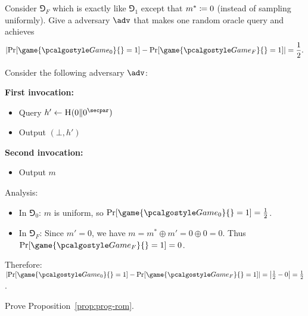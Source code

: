 \begin{exercise}
  Consider $\Game_F$ which is exactly like $\Game_1$ except that $m^* \coloneq 0$ (instead of sampling uniformly). Give a \ppt adversary $\adv$ that makes one random oracle query and achieves
  \[
    \left|\Pr[\game{\Game_0}{} = 1] - \Pr[\game{\Game_F}{} = 1]\right| = \frac{1}{2}.
  \]
\end{exercise}

\ifsolutions
\begin{mysolution}
  Consider the following adversary $\adv$:
  
  \textbf{First invocation:}
  \begin{itemize}
    \item Query $h' \gets \pcoracle{H}(0 \| 0^\secpar)$
    \item Output $(\bot, h')$
  \end{itemize}
  
  \textbf{Second invocation:}
  \begin{itemize}
    \item Output $m$
  \end{itemize}
  
  Analysis:
  \begin{itemize}
    \item In $\Game_0$: $m$ is uniform, so $\Pr[\game{\Game_0}{} = 1] = \frac{1}{2}$.
    \item In $\Game_F$: Since $m' = 0$, we have $m = m^* \oplus m' = 0 \oplus 0 = 0$. Thus $\Pr[\game{\Game_F}{} = 1] = 0$.
  \end{itemize}
  
  Therefore: $\left|\Pr[\game{\Game_0}{} = 1] - \Pr[\game{\Game_F}{} = 1]\right| = \left|\frac{1}{2} - 0\right| = \frac{1}{2}$.
\end{mysolution}
\fi

\begin{exercise}\label{ex:prog-rom}
  Prove Proposition~\ref{prop:prog-rom}.
\end{exercise}

